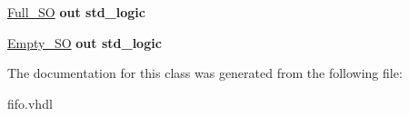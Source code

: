 \begin{DoxyCompactItemize}
\item 
\mbox{\label{classFIFO_a4532243c467861ba189f3da46dc354e9}} 
\hyperlink{classFIFO_a4532243c467861ba189f3da46dc354e9}{Full\+\_\+\+SO}  {\bfseries {\bfseries \textcolor{vhdlchar}{out}\textcolor{vhdlchar}{ }}} {\bfseries \textcolor{vhdlchar}{std\+\_\+logic}\textcolor{vhdlchar}{ }} 
\item 
\mbox{\label{classFIFO_afc033ac2b25da2bcb58a7d1a7fee0c9b}} 
\hyperlink{classFIFO_afc033ac2b25da2bcb58a7d1a7fee0c9b}{Empty\+\_\+\+SO}  {\bfseries {\bfseries \textcolor{vhdlchar}{out}\textcolor{vhdlchar}{ }}} {\bfseries \textcolor{vhdlchar}{std\+\_\+logic}\textcolor{vhdlchar}{ }} 
\end{DoxyCompactItemize}


The documentation for this class was generated from the following file\+:\begin{DoxyCompactItemize}
\item 
fifo.\+vhdl\end{DoxyCompactItemize}
